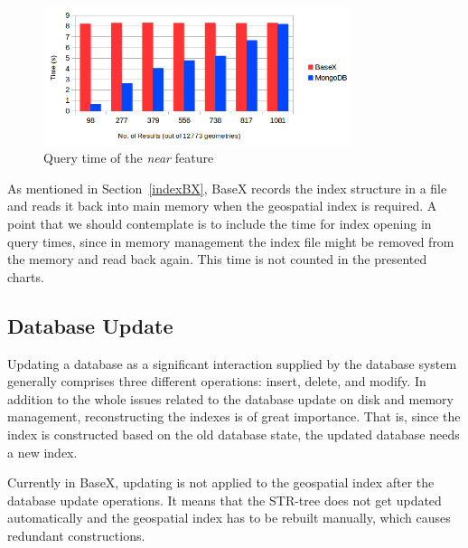 \documentclass[a4paper,12pt]{article}
\begin{document}
\begin{figure}
\centering
\includegraphics[width=0.8\textwidth]{BXvsMongoNear-newColor-new.png}
\caption{Query time of the \textit{near} feature}
\label{figBXvsMongoNear}
\end{figure}


As mentioned in Section~\ref{indexBX}, BaseX records the index structure in a file and reads it back into main memory when the geospatial index is required. A point that we should contemplate is to include the time for index opening in query times, since in memory management the index file might be removed from the memory and read back again. This time is not counted in the presented charts.


\subsection{Database Update}
\label{update}
Updating a database as a significant interaction supplied by the database system generally comprises three different operations: insert, delete, and modify. In addition to the whole issues related to the database update on disk and memory management, reconstructing the indexes is of great importance. That is, since the index is constructed based on the old database state, the updated database needs a new index. %

Currently in BaseX, updating is not applied to the geospatial index after the database update operations. It means that the STR-tree does not get updated automatically and the geospatial index has to be rebuilt manually, which causes redundant constructions. %
\end{document}
